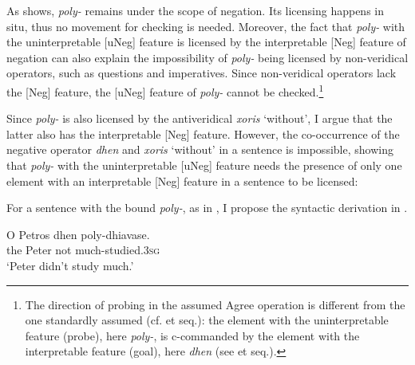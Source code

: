 \documentclass[output=paper]{langscibook}
\begin{document}
As  shows, \textit{poly-} remains under the scope of negation. Its licensing happens in situ, thus no movement for checking is needed. Moreover, the fact that \textit{poly-} with the uninterpretable [uNeg] feature is licensed by the interpretable [Neg] feature of negation can also explain the impossibility of \textit{poly-} being licensed by non-veridical operators, such as questions and imperatives. Since non-veridical operators lack the [Neg] feature, the [uNeg] feature of \textit{poly-} cannot be checked.\footnote{The direction of probing in the assumed Agree operation is different from the one standardly assumed (cf. \citealt{chomsky2000min} et seq.): the element with the uninterpretable feature (probe), here \textit{poly-}, is c-commanded by the element with the interpretable feature (goal), here \textit{dhen} (see \citealt{hedde2004phd} et seq.).}

Since \textit{poly-} is also licensed by the antiveridical \textit{xoris} `without', I argue that the latter also has the interpretable [Neg] feature. However, the co-occurrence of the negative operator \textit{dhen} and \textit{xoris} `without' in a sentence is impossible, showing that \textit{poly-} with the uninterpretable [uNeg] feature needs the presence of only one element with an interpretable [Neg] feature in a sentence to be licensed:

\begin{exe}
\label{gia:ex29}
\end{exe}

\noindent For a sentence with the bound \textit{poly-}, as in , I propose the syntactic derivation in .

\begin{exe}
\ex\label{gia:ex30}
    \gll O Petros dhen poly-dhiavase. \\
    the Peter not much-studied.\textsc{3sg} \\
    \trans `Peter didn't study much.'
\end{exe}
\end{document}
